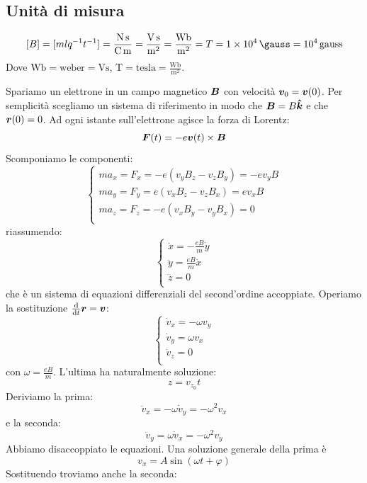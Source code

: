 \subsection{Unità di misura}
\[[B]=[mlq^{-1}t^{-1}]=\frac{\si{\newton\second}}{\si{\coulomb\meter}}=\frac{\si{\volt\second}}{\si{\meter\squared}}=\frac{\si{\weber}}{\si{\metre\squared}}=T=\SI{1E4}{\gauss}=10^4\,\text{gauss}\]
Dove $\si{\weber}=\text{weber}=\si{\volt\second}$, $\si{\tesla}=\text{tesla}=\frac{\si{\weber}}{\si{\meter\squared}}$.
\begin{Es}
  \label{es_Larmor}
  Spariamo un elettrone in un campo magnetico $\boldsymbol{B}$ con velocità $\boldsymbol{v}_0=\boldsymbol{v}(0)$. Per semplicità scegliamo un sistema di riferimento in modo che $\boldsymbol{B}=B\boldsymbol{\hat {k}}$ e che $\boldsymbol{r}(0)=0$. Ad ogni istante sull'elettrone agisce la forza di Lorentz:
  \[\boldsymbol{F}(t)=-e\boldsymbol{v}(t)\times \boldsymbol{B}\]
  Scomponiamo le componenti:
  \[\left\{
    \begin{array}{l}
      ma_x=F_x=-e\left(v_yB_z-v_zB_y\right)=-ev_yB \\
      ma_y=F_y=e\left(v_xB_z-v_zB_x\right)=ev_xB   \\
      ma_z=F_z=-e\left(v_xB_y-v_yB_x\right)=0      \\
    \end{array}\right.\]
  riassumendo:
  \[\left\{
    \begin{array}{l}
      \ddot x=-\frac{eB}{m}\dot y \\
      \ddot y=\frac{eB}{m}\dot x  \\
      \ddot z=0                   \\
    \end{array}\right.\]
  che è un sistema di equazioni differenziali del second'ordine accoppiate. Operiamo la sostituzione $\frac{\mathrm{d}}{\mathrm{d} t}\boldsymbol{r}=\boldsymbol{v}$:
  \[
    \left\{
    \begin{array}{l}
      \dot v_x=-\omega v_y \\
      \dot v_y=\omega v_x  \\
      \dot v_z=0           \\
    \end{array}\right.\]
  con $\omega=\frac{eB}{m}$. L'ultima ha naturalmente soluzione:
  \[z=v_{z_0}t\]
  Deriviamo la prima:
  \[\ddot v_x=-\omega\dot v_y=-\omega^2 v_x\]
  e la seconda:
  \[\ddot v_y=\omega\dot v_x=-\omega^2 v_y\]
  Abbiamo disaccoppiato le equazioni. Una soluzione generale della prima è
  \[v_x=A\sin\left(\omega t+\varphi\right)\]
  Sostituendo troviamo anche la seconda:

\end{Es}

